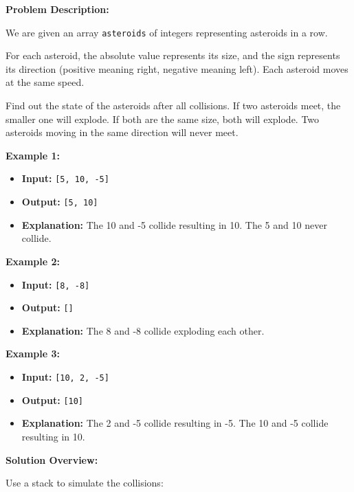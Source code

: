

\textbf{Problem Description:}

We are given an array \texttt{asteroids} of integers representing asteroids in a row.

For each asteroid, the absolute value represents its size, and the sign represents its direction (positive meaning right, negative meaning left). Each asteroid moves at the same speed.

Find out the state of the asteroids after all collisions. If two asteroids meet, the smaller one will explode. If both are the same size, both will explode. Two asteroids moving in the same direction will never meet.

\textbf{Example 1:}

\begin{itemize}
    \item \textbf{Input:} \texttt{[5, 10, -5]}
    \item \textbf{Output:} \texttt{[5, 10]}
    \item \textbf{Explanation:} The 10 and -5 collide resulting in 10. The 5 and 10 never collide.
\end{itemize}

\textbf{Example 2:}

\begin{itemize}
    \item \textbf{Input:} \texttt{[8, -8]}
    \item \textbf{Output:} \texttt{[]}
    \item \textbf{Explanation:} The 8 and -8 collide exploding each other.
\end{itemize}

\textbf{Example 3:}

\begin{itemize}
    \item \textbf{Input:} \texttt{[10, 2, -5]}
    \item \textbf{Output:} \texttt{[10]}
    \item \textbf{Explanation:} The 2 and -5 collide resulting in -5. The 10 and -5 collide resulting in 10.
\end{itemize}

\textbf{Solution Overview:}

Use a stack to simulate the collisions:

